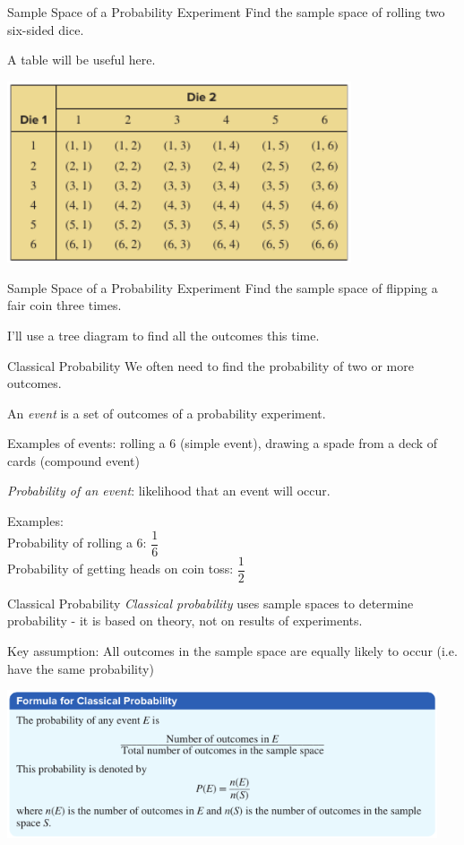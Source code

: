 \documentclass[t, aspectratio=169]{beamer}
\newcommand{\?}{\stackrel{?}{=}}
\begin{document}
	\begin{frame}{Sample Space of a Probability Experiment}
		Find the sample space of rolling two six-sided dice. \pause
		
		A table will be useful here. \pause
		
		\includegraphics[width=4in]{two-dice.png}
	\end{frame}

	\begin{frame}{Sample Space of a Probability Experiment}
		Find the sample space of flipping a fair coin three times. \pause
		
		I'll use a tree diagram to find all the outcomes this time.
	\end{frame}

	\begin{frame}{Classical Probability}
		We often need to find the probability of two or more outcomes.
		
		An \textit{event} is a set of outcomes of a probability experiment. \pause
		
		Examples of events: rolling a 6 (simple event), drawing a spade from a deck of cards (compound event) \pause
		
		\textit{Probability of an event}: likelihood that an event will occur. \pause
		
		Examples: \\ Probability of rolling a 6: $\dfrac16$ \\ Probability of getting heads on coin toss: $\dfrac12$
	\end{frame}

	\begin{frame}{Classical Probability}
		\textit{Classical probability} uses sample spaces to determine probability - it is based on theory, not on results of experiments. \pause
		
		Key assumption: All outcomes in the sample space are equally likely to occur (i.e. have the same probability) \pause
		
		\includegraphics[width=5in]{classical.png}
	\end{frame}
\end{document}
